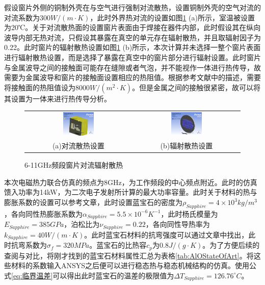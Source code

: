 \documentclass[master]{thesis-uestc}
\begin{document}
假设窗片外侧的铜制外壳在与空气进行强制对流散热，设置铜制外壳的空气对流的对流系数为\(300 W/ (m \cdot K)\)，此时外界热对流的设置如图\ref{fig:X频段窗片对流辐射散热} (a)所示，室温被设置为20℃。关于对流散热面的设置窗片表面由于焊接在器件内部，此时假设其在纵向波导内部无热对流，只假设其暴露在真空的单元存在辐射散热，并且取辐射因子为0.22。此时窗片的辐射散热设置如图\ref{fig:X频段窗片对流辐射散热} (b)所示，本次计算并未选择一整个窗片表面进行辐射散热设置，而是选择了暴露在真空中的窗片部分进行辐射设置。此时窗片与金属波导之间的接触面可能存在缝隙或者气泡，并不能视作一体进行热传导，故需要为金属波导和窗片的接触面设置相应的热阻值。根据参考文献\cite{jiang_2022_design}中的描述，需要将接触面的热阻值设为8000\(W / (m^2 \cdot K)\)。但是金属之间的接触很紧密，故可以将其设置为一体来进行热传导分析。
\begin{figure}[!htb]
    \small
    \centering
    \begin{tabular}{@{\ }c@{\ }c}
        \includegraphics[width=0.3\textwidth]{pic/chapter3/窗片对流系数.png} & 
        \hspace{5pt}
        \includegraphics[width=0.3\textwidth]{pic/chapter3/辐射单元选择.png}     \\
        \mbox{\small (a)对流散热设置}                                                                               & 
        \mbox{\small (b)辐射散热设置}                                                                                  \\
    \end{tabular}
    \caption{6-11GHz频段窗片对流辐射散热}
    \label{fig:X频段窗片对流辐射散热}
\end{figure}

本次电磁热力联合仿真的频点为8GHz，为工作频段的中心频点附近。此时的仿真馈入功率为14kW，为二次电子发射所计算的最大功率容量。此时关于材料的热与膨胀系数的设置可以参考文章\cite{thumm_stateart_2020}，此时设置蓝宝石的密度为\( \rho_{Sapphire}= 4 \times 10^3 kg/ m^3\)，各向同性热膨胀系数为\(\alpha_{Sapphire} = 5.5 \times 10 ^{-6}K^{-1}\)，此时杨氏模量为\( E_{Sapphire}= 385 GPa \)，泊松比为\( \nu_{Sapphire}= 0.22 \)，各向同性导热率为\(k_{Sapphire} =40 W/(m \cdot K)\)。此时蓝宝石材料的抗弯强度可以通过文章\cite{hanyong_diff_2011}中找出，此时抗弯系数为\(\sigma_{f} = 320MPa\)。蓝宝石的比热容\(c_p\)为\(0.8 J/ (g \cdot K)\)。为了方便后续的查阅与对比，将刚才找到的蓝宝石材料属性汇总为表格\ref{tab:AlOStateOfArt}。将这些材料的系数输入ANSYS之后便可以进行稳态热与稳态机械结构的仿真。使用公式\ref{eq:临界温差}可以得出此时蓝宝石的温差的极限值为\(\Delta T_{Sapphire} = 126.76 ^\circ C\)。
\end{document}
